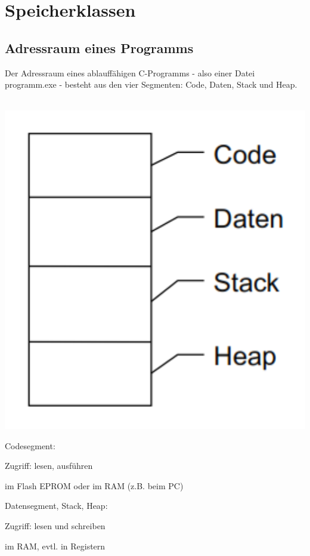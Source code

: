 \section{Speicherklassen }
	\subsection{Adressraum eines Programms }
		\begin{minipage}[t]{10 cm}
			Der Adressraum eines ablauffähigen C-Programms - also einer Datei programm.exe - besteht aus den vier Segmenten: Code, Daten, Stack und Heap.\\\\
			\begin{minipage}[c]{4 cm}
				\includegraphics[width=1\textwidth]{pics/Adressraum.png}
			\end{minipage}
			\hspace*{0.5cm}
			\begin{minipage}[c]{5 cm}
				Codesegment:
				\begin{compactitem}
					\item Zugriff: lesen, ausführen
					\item im Flash EPROM oder im RAM (z.B. beim PC)
				\end{compactitem}
				\vspace*{0.5cm}
				Datensegment, Stack, Heap:
				\begin{compactitem}
					\item Zugriff: lesen und schreiben
					\item im RAM, evtl. in Registern
				\end{compactitem}				
			\end{minipage}
		\end{minipage}
